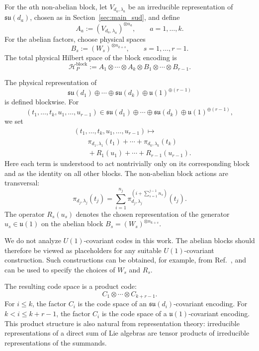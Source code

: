 \documentclass[10pt,twocolumn,superscriptaddress,aps,amsmath,amssymb,citeautoscript,floatfix,prx,longbibliography]{revtex4-2}
\newcounter{alg}
\theoremstyle{plain}
\theoremstyle{plain}
\theoremstyle{plain}
\theoremstyle{plain}
\theoremstyle{plain}
\theoremstyle{plain}
\begin{document}
For the $a$th non-abelian block, let $V_{d_a,\lambda_a}$ be an irreducible representation of $\mathfrak{su}(d_a)$, chosen as in Section~\ref{sec:main_sud}, and define
$$
    A_a
    :=
    (V_{d_a,\lambda_a})^{\otimes n_a},
    \qquad
    a=1,\ldots,k .
$$
For the abelian factors, choose physical spaces
$$
    B_s
    :=
    (W_s)^{\otimes n_{k+s}},
    \qquad
    s=1,\ldots,r-1 .
$$
The total physical Hilbert space of the block encoding is
$$
    \mathcal H_P^{\mathrm{block}}
    :=
    A_1
    \otimes
    \cdots
    \otimes
    A_k
    \otimes
    B_1
    \otimes
    \cdots
    \otimes
    B_{r-1}.
$$

The physical representation of
$$
    \mathfrak{su}(d_1)
    \oplus
    \cdots
    \oplus
    \mathfrak{su}(d_k)
    \oplus
    \mathfrak{u}(1)^{\oplus(r-1)}
$$
is defined blockwise. For
$$
    (t_1,\ldots,t_k,u_1,\ldots,u_{r-1})
    \in
    \mathfrak{su}(d_1)
    \oplus
    \cdots
    \oplus
    \mathfrak{su}(d_k)
    \oplus
    \mathfrak{u}(1)^{\oplus(r-1)},
$$
we set
\begin{equation}\label{eq:block_enc_def}
\begin{aligned}
    &(t_1,\ldots,t_k,u_1,\ldots,u_{r-1})
    \longmapsto
    \\
    &\qquad
    \pi_{d_1,\lambda_1}(t_1)
    +
    \cdots
    +
    \pi_{d_k,\lambda_k}(t_k)\\
    &\qquad+
    R_1(u_1)
    +
    \cdots
    +
    R_{r-1}(u_{r-1}) .
\end{aligned}
\end{equation}
Here each term is understood to act nontrivially only on its corresponding block and as the identity on all other blocks. The non-abelian block actions are transversal:
\begin{equation}
    \pi_{d_j,\lambda_j}(t_j)
    =
    \sum_{i=1}^{n_j}
    \pi_{d_j,\lambda_j}^{(i+\sum_{s=1}^{j-1}n_s)}(t_j).
\end{equation}
The operator $R_s(u_s)$ denotes the chosen representation of the generator $u_s\in\mathfrak{u}(1)$ on the abelian block $B_s=(W_s)^{\otimes n_{k+s}}$.

We do not analyze $U(1)$-covariant codes in this work. The abelian blocks should therefore be viewed as placeholders for any suitable $U(1)$-covariant construction. Such constructions can be obtained, for example, from Ref.~\cite{Lin2025}, and can be used to specify the choices of $W_s$ and $R_s$.

The resulting code space is a product code:
\begin{equation}\label{eq:product_code}
    C_1
    \otimes
    \cdots
    \otimes
    C_{k+r-1}.
\end{equation}
For $i\le k$, the factor $C_i$ is the code space of an $\mathfrak{su}(d_i)$-covariant encoding. For $k<i\le k+r-1$, the factor $C_i$ is the code space of a $\mathfrak{u}(1)$-covariant encoding. This product structure is also natural from representation theory: irreducible representations of a direct sum of Lie algebras are tensor products of irreducible representations of the summands.
\end{document}
